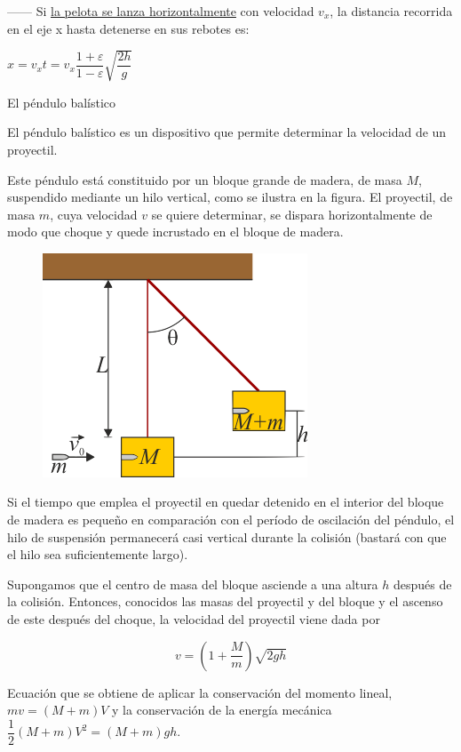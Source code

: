 ------ Si \underline{la pelota se lanza horizontalmente} con velocidad $v_x$, la distancia recorrida en el eje x hasta detenerse en sus rebotes es:

$x=v_x t=v_x \dfrac{1+\varepsilon}{1-\varepsilon} \sqrt{\dfrac{2h}{g}}$




\newpage %
\begin{myblock}{El péndulo balístico}

El péndulo balístico es un dispositivo que permite determinar la velocidad de un proyectil.

\begin{multicols}{2}
\vspace{2mm} Este péndulo está constituido por un bloque grande de madera, de masa $M$, suspendido mediante un hilo vertical, como se ilustra en la figura. El proyectil, de masa $m$, cuya velocidad $v$ se quiere determinar, se dispara horizontalmente de modo que choque y quede incrustado en el bloque de madera.
\begin{figure}[H]
	\centering
	\includegraphics[width=.5\textwidth]{imagenes/imagenes17/T17IM07.png}
	\end{figure}
\end{multicols}
\vspace{2mm} Si el tiempo que emplea el proyectil en quedar detenido en el interior del bloque de madera es pequeño en comparación con el período de oscilación del péndulo, el hilo de suspensión permanecerá casi vertical durante la colisión (bastará con que el hilo sea suficientemente largo). 

\vspace{2mm} Supongamos que el centro de masa del bloque asciende a una altura $h$ después de la colisión. Entonces, conocidos las masas del proyectil y del bloque y el ascenso de este después del choque, la velocidad del proyectil viene dada por 

$$v=\left( 1 + \dfrac M m \right) \sqrt{2gh}$$

\vspace{2mm} Ecuación que se obtiene de aplicar la conservación del momento lineal, $mv=(M+m)V$ y la conservación de la energía mecánica $\dfrac 1 2 (M+m) V^2=(M+m)gh$.
\end{myblock}



